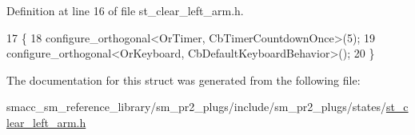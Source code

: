Definition at line 16 of file st\+\_\+clear\+\_\+left\+\_\+arm.\+h.


\begin{DoxyCode}
17     \{
18         configure\_orthogonal<OrTimer,  CbTimerCountdownOnce>(5);    
19         configure\_orthogonal<OrKeyboard, CbDefaultKeyboardBehavior>();
20     \}
\end{DoxyCode}


The documentation for this struct was generated from the following file\+:\begin{DoxyCompactItemize}
\item 
smacc\+\_\+sm\+\_\+reference\+\_\+library/sm\+\_\+pr2\+\_\+plugs/include/sm\+\_\+pr2\+\_\+plugs/states/\hyperlink{st__clear__left__arm_8h}{st\+\_\+clear\+\_\+left\+\_\+arm.\+h}\end{DoxyCompactItemize}
